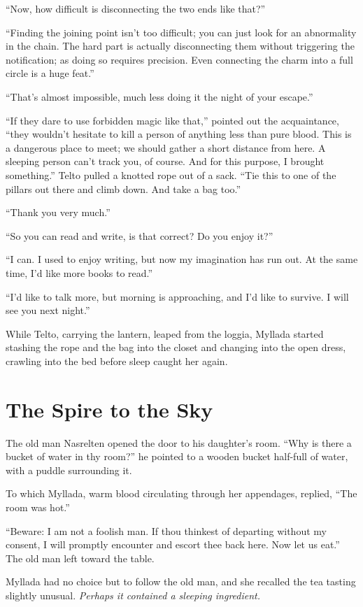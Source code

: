 ``Now, how difficult is disconnecting the two ends like that?''

``Finding the joining point isn't too difficult; you can just look for an abnormality in the chain. The hard part is actually disconnecting them without triggering the notification; as doing so requires precision. Even connecting the charm into a full circle is a huge feat.''

``That's almost impossible, much less doing it the night of your escape.''

``If they dare to use forbidden magic like that,'' pointed out the acquaintance, ``they wouldn't hesitate to kill a person of anything less than pure blood. This is a dangerous place to meet; we should gather a short distance from here. A sleeping person can't track you, of course. And for this purpose, I brought something.'' Telto pulled a knotted rope out of a sack. ``Tie this to one of the pillars out there and climb down. And take a bag too.''

``Thank you very much.''

``So you can read and write, is that correct? Do you enjoy it?''

``I can. I used to enjoy writing, but now my imagination has run out. At the same time, I'd like more books to read.''

``I'd like to talk more, but morning is approaching, and I'd like to survive. I will see you next night.''

While Telto, carrying the lantern, leaped from the loggia, Myllada started stashing the rope and the bag into the closet and changing into the open dress, crawling into the bed before sleep caught her again.

\chapter{The Spire to the Sky}

The old man Nasrelten opened the door to his daughter's room. ``Why is there a bucket of water in thy room?'' he pointed to a wooden bucket half-full of water, with a puddle surrounding it.

To which Myllada, warm blood circulating through her appendages, replied, ``The room was hot.''

``Beware: I am not a foolish man. If thou thinkest of departing without my consent, I will promptly encounter and escort thee back here. Now let us eat.'' The old man left toward the table.

Myllada had no choice but to follow the old man, and she recalled the tea tasting slightly unusual. \emph{Perhaps it contained a sleeping ingredient.}

